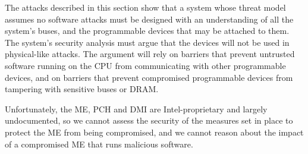 
The attacks described in this section show that a system whose threat model
assumes no software attacks must be designed with an understanding of all the
system's buses, and the programmable devices that may be attached to them. The
system's security analysis must argue that the devices will not be used in
physical-like attacks. The argument will rely on barriers that prevent
untrusted software running on the CPU from communicating with other
programmable devices, and on barriers that prevent compromised programmable
devices from tampering with sensitive buses or DRAM.

Unfortunately, the ME, PCH and DMI are Intel-proprietary and largely
undocumented, so we cannot assess the security of the measures set in place to
protect the ME from being compromised, and we cannot reason about the impact
of a compromised ME that runs malicious software.
